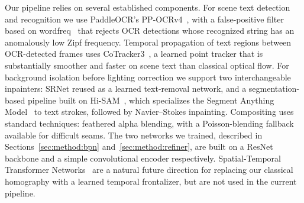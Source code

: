Our pipeline relies on several established components. For scene
text detection and recognition we use PaddleOCR's
PP-OCRv4~\citep{paddleocr2024}, with a false-positive filter based
on wordfreq~\citep{wordfreq} that rejects OCR detections whose
recognized string has an anomalously low Zipf frequency. Temporal
propagation of text regions between OCR-detected frames uses
CoTracker3~\citep{karaev2024cotracker3}, a learned point tracker
that is substantially smoother and faster on scene text than
classical optical flow. For background isolation before lighting
correction we support two interchangeable inpainters: SRNet reused
as a learned text-removal network, and a segmentation-based pipeline
built on Hi-SAM~\citep{ye2024hisam}, which specializes the Segment
Anything Model~\citep{kirillov2023sam} to text strokes, followed by
Navier--Stokes inpainting. Compositing uses standard techniques:
feathered alpha blending, with a Poisson-blending
fallback~\citep{perez2003poisson} available for difficult seams.
The two networks we trained, described in
Sections~\ref{sec:method:bpn} and~\ref{sec:method:refiner}, are
built on a ResNet~\citep{he2016resnet} backbone and a simple
convolutional encoder respectively. Spatial-Temporal Transformer
Networks~\citep{zeng2020sttn} are a natural future direction for
replacing our classical homography with a learned temporal
frontalizer, but are not used in the current pipeline.
